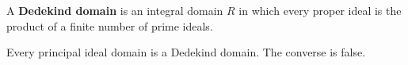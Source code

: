 A \textbf{Dedekind domain} is an integral domain $R$ in which every proper ideal is the product of a finite number of prime ideals.

Every principal ideal domain is a Dedekind domain. The converse is false.
